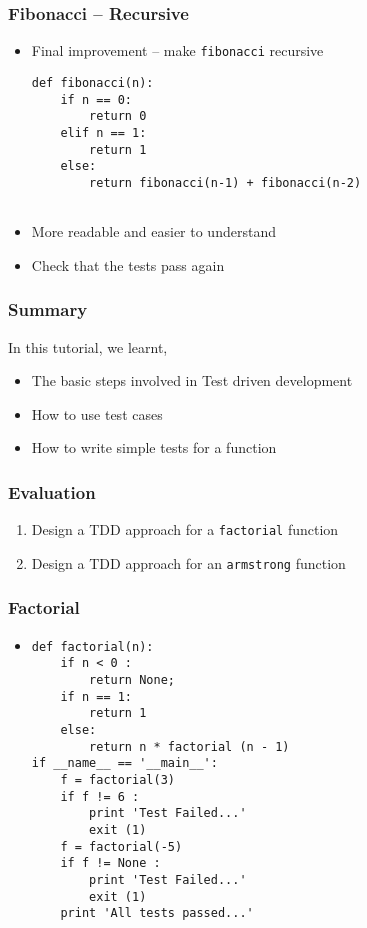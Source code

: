 \documentclass[17pt,compress]{beamer}
\begin{document}
\begin{frame}[fragile]
  \frametitle{Fibonacci -- Recursive}
  \begin{itemize}
  \item Final improvement -- make \texttt{fibonacci} recursive
  \tiny
{
\begin{lstlisting}
def fibonacci(n):
    if n == 0:
        return 0
    elif n == 1:
        return 1
    else:
        return fibonacci(n-1) + fibonacci(n-2)
        
\end{lstlisting}
}
  \small 
  \item More readable and easier to understand
  \item Check that the tests pass again
  \end{itemize}
\end{frame}


\begin{frame}
\frametitle{Summary}
\label{sec-8}

In this tutorial, we learnt,


\begin{itemize}
\item The basic steps involved in Test driven development
\item How to use test cases
\item How to write simple tests for a function


\end{itemize}
\end{frame}

\begin{frame}[fragile]
\frametitle{Evaluation}
\label{sec-9}


\begin{enumerate}
\item Design a TDD approach for a \texttt{factorial} function
\vspace{8pt}
\item Design a TDD approach for an \texttt{armstrong} function
\end{enumerate}
\end{frame}

\begin{frame}[fragile]
\frametitle{Factorial}
\label{sec-10}
\begin{itemize}
\item
{\tiny
\begin{lstlisting}
def factorial(n):
    if n < 0 :
        return None;
    if n == 1:
        return 1
    else:
        return n * factorial (n - 1)
if __name__ == '__main__':
    f = factorial(3)
    if f != 6 :
        print 'Test Failed...'
        exit (1)    
    f = factorial(-5)
    if f != None :
        print 'Test Failed...'
        exit (1)    
    print 'All tests passed...'
\end{lstlisting}
}
\end{itemize}
\end{frame}
\end{document}
